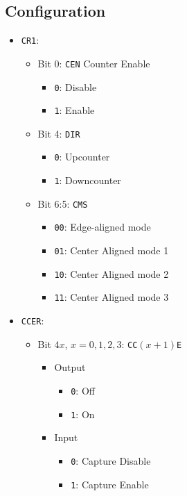 \documentclass[a4paper,12pt,openany]{book}
\begin{document}
\subsection{Configuration}
\begin{itemize}
    \item \texttt{CR1}:
    \begin{itemize}
        \item Bit 0: \texttt{CEN} Counter Enable
        \begin{itemize}
            \item \texttt{0}: Disable
            \item \texttt{1}: Enable
        \end{itemize}
        \item Bit 4: \texttt{DIR}
        \begin{itemize}
            \item \texttt{0}: Upcounter
            \item \texttt{1}: Downcounter
        \end{itemize}
        \item Bit 6:5: \texttt{CMS}
        \begin{itemize}
            \item \texttt{00}: Edge-aligned mode
            \item \texttt{01}: Center Aligned mode 1
            \item \texttt{10}: Center Aligned mode 2
            \item \texttt{11}: Center Aligned mode 3
        \end{itemize}
    \end{itemize}
    \item \texttt{CCER}:
    \begin{itemize}
        \item Bit $4x$, $x = 0,1,2,3$: \texttt{CC$(x+1)$E}
        \begin{itemize}
            \item Output
            \begin{itemize}
                \item \texttt{0}: Off
                \item \texttt{1}: On
            \end{itemize}
            \item Input
            \begin{itemize}
                \item \texttt{0}: Capture Disable
                \item \texttt{1}: Capture Enable

\end{itemize}
\end{itemize}
\end{itemize}
\end{itemize}
\end{document}

